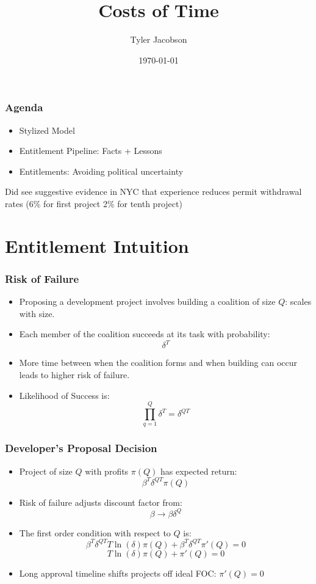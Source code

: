 \documentclass{beamer}
\title{Costs of Time}
\author{Tyler Jacobson}
\date{\today}
\begin{document}
\maketitle

\begin{frame}
    \frametitle{Agenda}
   \begin{itemize}
    \item Stylized Model
    \item Entitlement Pipeline: Facts + Lessons
    \item Entitlements: Avoiding political uncertainty
   \end{itemize} 
   Did see suggestive evidence in NYC that experience reduces permit withdrawal rates (6\% for first project 2\% for tenth project)
\end{frame}

\section{Entitlement Intuition}

\begin{frame}
    \frametitle{Risk of Failure}
   \begin{itemize}
    \item Proposing a development project involves building a coalition of size $Q$: scales with size.
    \item Each member of the coalition succeeds at its task with probability:
    $$\delta^T$$
    \item More time between when the coalition forms and when building can occur leads to higher risk of failure. 
    \item Likelihood of Success is:
    $$\prod_{q=1}^Q \delta^T = \delta^{QT}$$ 
   \end{itemize} 
\end{frame}

\begin{frame}
    \frametitle{Developer's Proposal Decision}
    \begin{itemize}
        \item Project of size $Q$ with profits $\pi(Q)$ has expected return:
   $$\beta^T  \delta^{QT} \pi(Q)$$
   \item Risk of failure adjusts discount factor from:
    $$\beta \to \beta\delta^Q$$
   \item The first order condition with respect to $Q$ is:
   $$\beta^T \delta^{QT}T\ln(\delta) \pi(Q) + \beta^T  \delta^{QT} \pi'(Q)=0 $$
   $$T\ln(\delta)\pi(Q) + \pi'(Q) = 0$$
   \item Long approval timeline shifts projects off ideal FOC: $\pi'(Q)=0$
    \end{itemize}
\end{frame}
\end{document}
